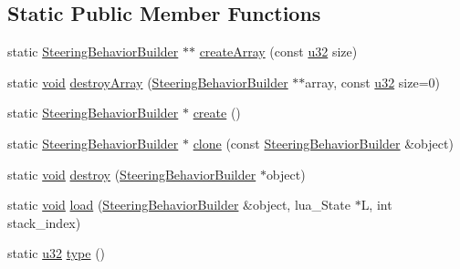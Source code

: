 \subsection*{Static Public Member Functions}
\begin{DoxyCompactItemize}
\item 
static \mbox{\hyperlink{classnjli_1_1_steering_behavior_builder}{Steering\+Behavior\+Builder}} $\ast$$\ast$ \mbox{\hyperlink{classnjli_1_1_steering_behavior_builder_a9443fbf6e5f32e9c774c7cf9dafa0b87}{create\+Array}} (const \mbox{\hyperlink{_util_8h_a10e94b422ef0c20dcdec20d31a1f5049}{u32}} size)
\item 
static \mbox{\hyperlink{_thread_8h_af1e856da2e658414cb2456cb6f7ebc66}{void}} \mbox{\hyperlink{classnjli_1_1_steering_behavior_builder_aa18561a56f6e028f606423025bbfbc51}{destroy\+Array}} (\mbox{\hyperlink{classnjli_1_1_steering_behavior_builder}{Steering\+Behavior\+Builder}} $\ast$$\ast$array, const \mbox{\hyperlink{_util_8h_a10e94b422ef0c20dcdec20d31a1f5049}{u32}} size=0)
\item 
static \mbox{\hyperlink{classnjli_1_1_steering_behavior_builder}{Steering\+Behavior\+Builder}} $\ast$ \mbox{\hyperlink{classnjli_1_1_steering_behavior_builder_aa53852bf591603694a821a489f47887c}{create}} ()
\item 
static \mbox{\hyperlink{classnjli_1_1_steering_behavior_builder}{Steering\+Behavior\+Builder}} $\ast$ \mbox{\hyperlink{classnjli_1_1_steering_behavior_builder_aa304bf81d3f542c2c1d70361f6626ded}{clone}} (const \mbox{\hyperlink{classnjli_1_1_steering_behavior_builder}{Steering\+Behavior\+Builder}} \&object)
\item 
static \mbox{\hyperlink{_thread_8h_af1e856da2e658414cb2456cb6f7ebc66}{void}} \mbox{\hyperlink{classnjli_1_1_steering_behavior_builder_aaad70995c2b65dd3e06a787bfdb8a9f5}{destroy}} (\mbox{\hyperlink{classnjli_1_1_steering_behavior_builder}{Steering\+Behavior\+Builder}} $\ast$object)
\item 
static \mbox{\hyperlink{_thread_8h_af1e856da2e658414cb2456cb6f7ebc66}{void}} \mbox{\hyperlink{classnjli_1_1_steering_behavior_builder_a20854519330e16a79e2ab6bd38735545}{load}} (\mbox{\hyperlink{classnjli_1_1_steering_behavior_builder}{Steering\+Behavior\+Builder}} \&object, lua\+\_\+\+State $\ast$L, int stack\+\_\+index)
\item 
static \mbox{\hyperlink{_util_8h_a10e94b422ef0c20dcdec20d31a1f5049}{u32}} \mbox{\hyperlink{classnjli_1_1_steering_behavior_builder_a959a85a3a585926da5ce2de515ad4ffc}{type}} ()
\end{DoxyCompactItemize}

